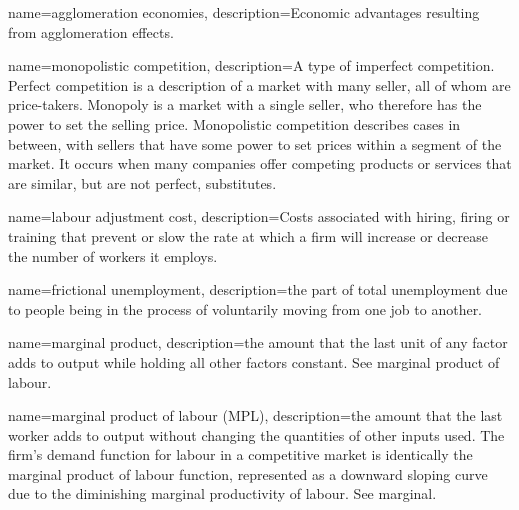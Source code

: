 
{
name=agglomeration economies,
description={Economic advantages %
resulting from \glspl{agglomeration effect}.}
}

{
name=monopolistic competition,
description={A type of  \gls{imperfect competition}. \gls{Perfect competition} is a description of a market with many seller, all of whom are price-takers. Monopoly is a market with a single seller, who therefore has the power to set the selling price. Monopolistic competition describes cases in between, with sellers that have some power to set prices within a segment of the market. It occurs when many companies offer competing products or services that are similar, but are not perfect, substitutes.}
}

{
name=labour adjustment cost,
description={Costs associated with hiring, firing or training that prevent or slow the rate at which a firm will increase or decrease the number of workers it employs.}
}

{
name=frictional unemployment,
description={the part of total unemployment  due to people being in the process of voluntarily moving from one job to another.}
}

{
name=marginal product,
description={the amount that the last unit of any factor  adds to output while holding all other factors constant. See \gls{marginal product of labour}.}
}


{
name=marginal product of labour (MPL),
description={the amount that the last worker  adds to output without changing the quantities of other inputs used. The firm's \gls{demand function} for labour in a competitive market is identically  the \gls{marginal product} of labour function, represented as a downward sloping curve due to the diminishing marginal productivity of labour. See \gls{marginal}.}
}

